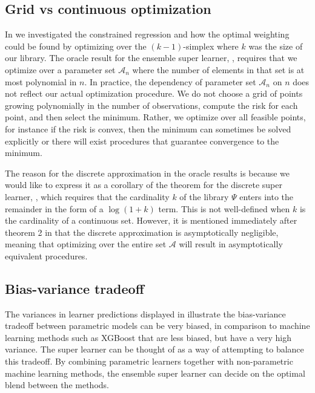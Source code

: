 \documentclass[11pt, a4paper]{article}
\theoremstyle{definition}
\theoremstyle{remark}
\newcommand{\ml}{k}
\newcommand{\lib}{\Psi}
\begin{document}
\subsection{Grid vs continuous optimization} 
In  we investigated the constrained regression and how the optimal weighting could be found by optimizing over the $ (\ml -1) $-simplex where $ \ml $ was the size of our library. The oracle result for the ensemble super learner, , requires that we optimize over a parameter set $ \mathcal{A}_n $ where the number of elements in that set is at most polynomial in $ n $. In practice, the dependency of parameter set $ \mathcal{A}_n $ on $ n $ does not reflect our actual optimization procedure. We do not choose a grid of points growing polynomially in the number of observations, compute the risk for each point, and then select the minimum. Rather, we optimize over all feasible points, for instance if the risk is convex, then the minimum can sometimes be solved explicitly or there will exist procedures that guarantee convergence to the minimum. 

The reason for the discrete approximation in the oracle results is because we would like to express it as a corollary of the theorem for the discrete super learner, , which requires that the cardinality $ k $ of the library $ \lib $ enters into the remainder in the form of a $ \log(1 + k) $ term. This is not well-defined when $ k $ is the cardinality of a continuous set. However, it is mentioned immediately after theorem 2 in \citet{van2007super} that the discrete approximation is asymptotically negligible, meaning that optimizing over the entire set $ \mathcal{A} $ will result in asymptotically equivalent procedures. 

\subsection{Bias-variance tradeoff} 
The variances in learner predictions displayed in  illustrate the bias-variance tradeoff between parametric models can be very biased, in comparison to machine learning methods such as XGBoost that are less biased, but have a very high variance. The super learner can be thought of as a way of attempting to balance this tradeoff. By combining parametric learners together with non-parametric machine learning methods, the ensemble super learner can decide on the optimal blend between the methods. 
\end{document}

